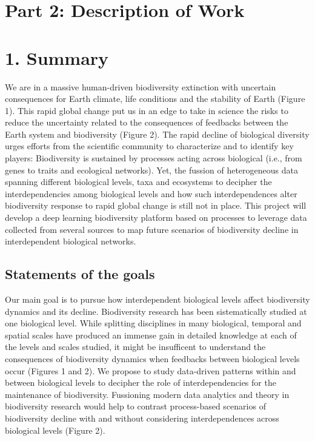 \documentclass[11pt]{article}
\begin{document}
\pagestyle{empty}

 \vspace{-1.25 in}
\section*{Part 2: Description of Work}
\section*{1. Summary}
We are in a massive human-driven biodiversity extinction with
uncertain consequences for Earth climate, life conditions and the
stability of Earth (Figure 1). This rapid global change put us in an
edge to take in science the risks to reduce the uncertainty related to
the consequences of feedbacks between the Earth system and
biodiversity (Figure 2). The rapid decline of biological diversity
urges efforts from the scientific community to characterize and to
identify key players: Biodiversity is sustained by processes acting
across biological (i.e., from genes to traits and ecological
networks). Yet, the fussion of heterogeneous data spanning different
biological levels, taxa and ecosystems to decipher the
interdependencies among biological levels and how such
interdependences alter biodiversity response to rapid global change is
still not in place. This project will develop a deep learning
biodiversity platform based on processes to leverage data collected
from several sources to map future scenarios of biodiversity decline
in interdependent biological networks.
\subsection*{Statements of the goals}
Our main goal is to pursue how interdependent biological levels affect
biodiversity dynamics and its decline. Biodiversity research has been
sistematically studied at one biological level. While splitting
disciplines in many biological, temporal and spatial scales have
produced an immense gain in detailed knowledge at each of the levels
and scales studied, it might be insufficent to understand the
consequences of biodiversity dynamics when feedbacks between
biological levels occur (Figures 1 and 2). We propose to study
data-driven patterns within and between biological levels to decipher
the role of interdependencies for the maintenance of
biodiversity. Fussioning modern data analytics and theory in
biodiversity research would help to contrast process-based scenarios
of biodiversity decline with and without considering interdependences
across biological levels (Figure 2).
\end{document}

